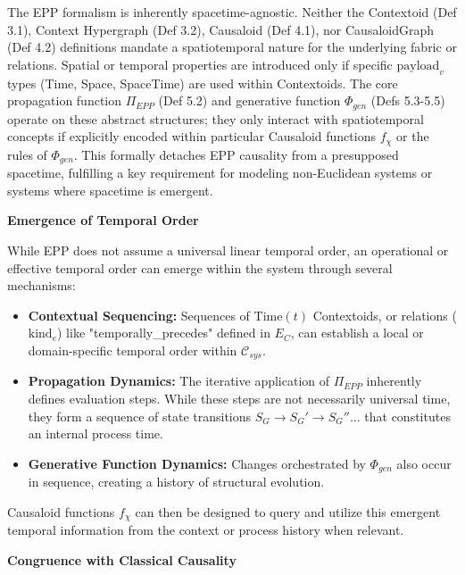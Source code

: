         
        The EPP formalism is inherently spacetime-agnostic. Neither the Contextoid (Def 3.1), Context Hypergraph (Def 3.2), Causaloid (Def 4.1), nor CausaloidGraph (Def 4.2) definitions mandate a spatiotemporal nature for the underlying fabric or relations. Spatial or temporal properties are introduced only if specific \(\text{payload}_v\) types (Time, Space, SpaceTime) are used within Contextoids. The core propagation function \(\Pi_{EPP}\) (Def 5.2) and generative function \(\Phi_{gen}\) (Defs 5.3-5.5) operate on these abstract structures; they only interact with spatiotemporal concepts if explicitly encoded within particular Causaloid functions \(f_\chi\) or the rules of \(\Phi_{gen}\). This formally detaches EPP causality from a presupposed spacetime, fulfilling a key requirement for modeling non-Euclidean systems or systems where spacetime is emergent.

        
\textbf{Emergence of Temporal Order}
        
        While EPP does not assume a universal linear temporal order, an operational or effective temporal order can emerge within the system through several mechanisms:
        \begin{itemize}
            \item \textbf{Contextual Sequencing:} Sequences of \(\text{Time}(t)\) Contextoids, or relations (\(\text{kind}_e\)) like "temporally\_precedes" defined in \(E_C\), can establish a local or domain-specific temporal order within \(\mathcal{C}_{sys}\).
            \item \textbf{Propagation Dynamics:} The iterative application of \(\Pi_{EPP}\) inherently defines evaluation steps. While these steps are not necessarily universal time, they form a sequence of state transitions \(S_G \to S_G' \to S_G'' \dots\) that constitutes an internal process time.
            \item \textbf{Generative Function Dynamics:} Changes orchestrated by \(\Phi_{gen}\) also occur in sequence, creating a history of structural evolution.
        \end{itemize}
        Causaloid functions \(f_\chi\) can then be designed to query and utilize this emergent temporal information from the context or process history when relevant.


\textbf{Congruence with Classical Causality}
        
